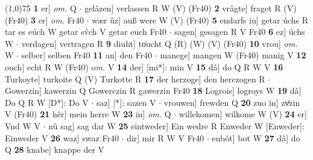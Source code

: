 \documentclass[8pt,a4paper,notitlepage]{article}
\begin{document}
\begin{table}[ht]
\begin{minipage}[t]{0.5\linewidth}
\line(1,0){75} \newline
\textbf{1} er] \textit{om.} Q  $\cdot$ gelâzen] verlassen R W (V) (Fr40) \textbf{2} vrâgte] fraget R (V) (Fr40) \textbf{3} er] \textit{om.} Fr40  $\cdot$ wær ûz] auß were W (V) (Fr40) \textbf{5} endarfs iu] getar úchs R tar es eúch W getar sv́ch V getar euch Fr40  $\cdot$ sagen] gesagen R V Fr40 \textbf{6} ez] úchs W  $\cdot$ verdagen] vertragen R \textbf{9} diuht] to͑ucht Q (R) (W) (V) (Fr40) \textbf{10} vrou] \textit{om.} W  $\cdot$ selber] selben Fr40 \textbf{11} an] den Fr40  $\cdot$ manege] mangen W (Fr40) manig V \textbf{12} ouch] echt R W (Fr40) o\textit{m. } V \textbf{14} der] [mi*]: min V \textbf{15} dâ] do Q R W V \textbf{16} Turkoyte] turkoite Q (V) Turkotte R \textbf{17} der herzoge] den herczogen R  $\cdot$ Gowerzin] kawerzin Q Gowerczin R gawerzin Fr40 \textbf{18} Logrois] logroys W \textbf{19} dâ] Do Q R W [D*]: Do V  $\cdot$ saz] [*]: sazen V  $\cdot$ vrouwen] frewden Q \textbf{20} zuo in] zvͦzin V (Fr40) \textbf{21} hêr] mein herre W \textbf{23} in] \textit{om.} Q  $\cdot$ willekomen] wilkome W (V) \textbf{24} er] Vnd W V  $\cdot$ nû sag] sag dar W \textbf{25} eintweder] Ein wedre R Enweder W [Enweder]: Einweder V \textbf{26} waz] swaz Fr40  $\cdot$ dir] mir R W V Fr40  $\cdot$ enbôt] bot W \textbf{27} dâ] do Q \textbf{28} knabe] knappe der V \newline
\end{minipage}
\end{table}
\end{document}
